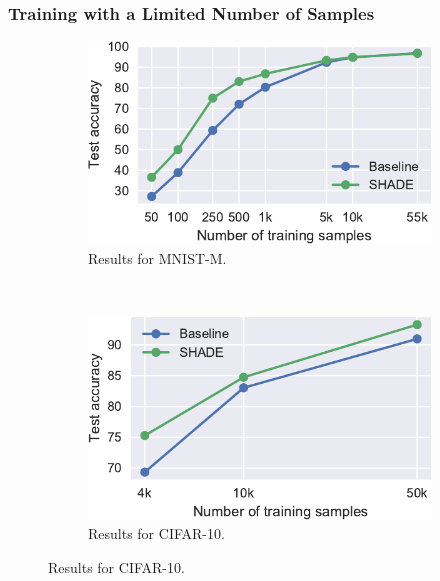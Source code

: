        
    \subsubsection{Training with a Limited Number of Samples}
        
        \begin{figure}[tb]
            \centering
            \begin{subfigure}[t]{0.49\textwidth}
                \includegraphics[width=\textwidth]{images/shade_MNISTM_reguls.pdf}
                \caption{Results for MNIST-M.}
                \label{shade:fig:limited_mnistm}
            \end{subfigure}%
            ~
            \begin{subfigure}[t]{0.49\textwidth}
                 \includegraphics[width=\textwidth]{images/shade_CIFAR10_reguls.pdf}
                \caption{Results for CIFAR-10.}
                \label{shade:fig:limited_cifar10}
            \end{subfigure}
            

\end{figure}
